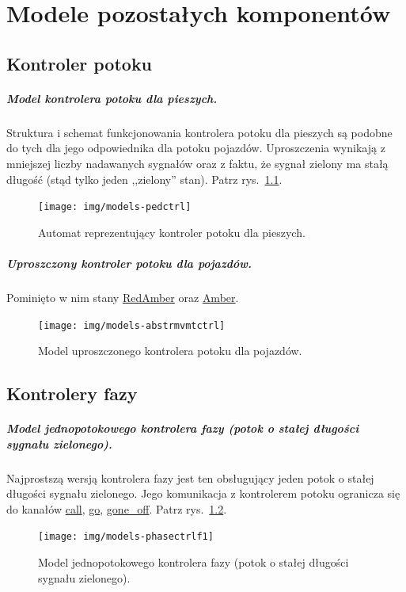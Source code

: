 \documentclass{pracamgr}
\newcommand{\imgr}[1]{rys.~\ref{#1}}
\newcommand{\ttt}[1]{\url{#1}}
\theoremstyle{plain}
\begin{document}
\chapter{Modele pozostałych komponentów}
\label{app:other-models}

\section{Kontroler potoku}
\paragraph{Model kontrolera potoku dla pieszych.} Struktura i schemat
funkcjonowania kontrolera potoku dla pieszych są podobne do tych dla
jego odpowiednika dla potoku pojazdów. Uproszczenia wynikają z
mniejszej liczby nadawanych sygnałów oraz z faktu, że sygnał zielony
ma stałą długość (stąd tylko jeden ,,zielony'' stan). Patrz
\imgr{img:models-extra:pedctrl}.
\begin{figure}[ht]
  \texttt{[image: img/models-pedctrl]}
  \caption{Automat reprezentujący kontroler potoku dla pieszych.}
  \label{img:models-extra:pedctrl}
\end{figure}

\paragraph{Uproszczony kontroler potoku dla pojazdów.} Pominięto w nim
stany \ttt{RedAmber} oraz \ttt{Amber}.
\begin{figure}[ht]
  \centering
  \texttt{[image: img/models-abstrmvmtctrl]}
  \caption{Model uproszczonego kontrolera potoku dla pojazdów.}
\end{figure}
\clearpage{}

\section{Kontrolery fazy}
\paragraph{Model jednopotokowego kontrolera fazy (potok o stałej
  długości sygnału zielonego).} Najprostszą wersją kontrolera fazy jest
ten obsługujący jeden potok o stałej długości sygnału zielonego. Jego
komunikacja z kontrolerem potoku ogranicza się do kanałów \ttt{call},
\ttt{go}, \ttt{gone_off}. Patrz \imgr{img:models-extra:phasectrlf1}.
\begin{figure}[h]
  \centering
  \texttt{[image: img/models-phasectrlf1]}
  \caption{Model jednopotokowego kontrolera fazy (potok o stałej
  długości sygnału zielonego).}
  \label{img:models-extra:phasectrlf1}
\end{figure}
\end{document}
